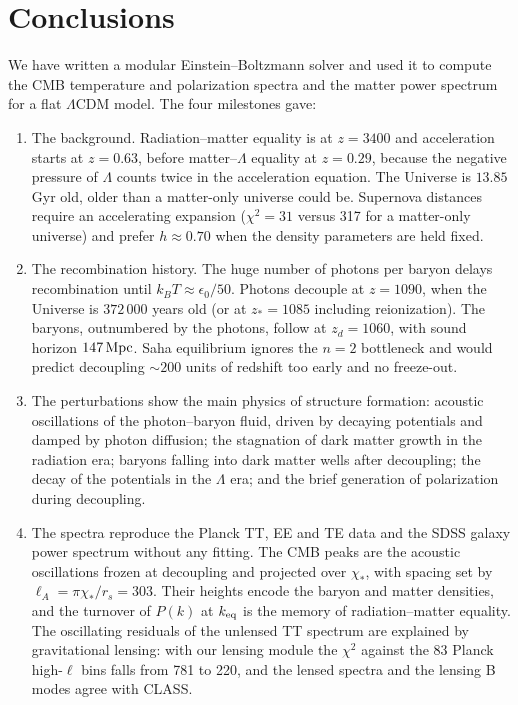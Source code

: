 \section{Conclusions}\label{sec:conclusions}

We have written a modular Einstein--Boltzmann solver and used it to compute the CMB temperature and polarization
spectra and the matter power spectrum for a flat $\Lambda$CDM model. The four milestones gave:
\begin{enumerate}
\item The background. Radiation--matter equality is at $z=3400$ and acceleration starts at $z=0.63$, before
      matter--$\Lambda$ equality at $z=0.29$, because the negative pressure of $\Lambda$ counts twice in the
      acceleration equation. The Universe is $13.85$\,Gyr old, older than a matter-only universe could be. Supernova
      distances require an accelerating expansion ($\chi^2=31$ versus 317 for a matter-only universe) and prefer
      $h\approx0.70$ when the density parameters are held fixed.
\item The recombination history. The huge number of photons per baryon delays recombination until
      $k_BT\approx\epsilon_0/50$. Photons decouple at $z=1090$, when the Universe is $372\,000$ years old (or at
      $z_*=1085$ including reionization). The baryons, outnumbered by the photons, follow at $z_d=1060$, with sound
      horizon $147\,\mathrm{Mpc}$. Saha equilibrium ignores the $n=2$ bottleneck and would predict decoupling $\sim200$ units of
      redshift too early and no freeze-out.
\item The perturbations show the main physics of structure formation: acoustic oscillations of the photon--baryon
      fluid, driven by decaying potentials and damped by photon diffusion; the stagnation of dark matter growth in the
      radiation era; baryons falling into dark matter wells after decoupling; the decay of the potentials in the
      $\Lambda$ era; and the brief generation of polarization during decoupling.
\item The spectra reproduce the Planck TT, EE and TE data and the SDSS galaxy power spectrum without any fitting. The
      CMB peaks are the acoustic oscillations frozen at decoupling and projected over $\chi_*$, with spacing set by
      $\ell_A=\pi\chi_*/r_s=303$. Their heights encode the baryon and matter densities, and the turnover of $P(k)$ at
      $k_{\rm eq}$ is the memory of radiation--matter equality. The oscillating residuals of the unlensed TT spectrum are
      explained by gravitational lensing: with our lensing module the $\chi^2$ against the 83 Planck high-$\ell$ bins
      falls from 781 to 220, and the lensed spectra and the lensing B modes agree with CLASS.
\end{enumerate}
